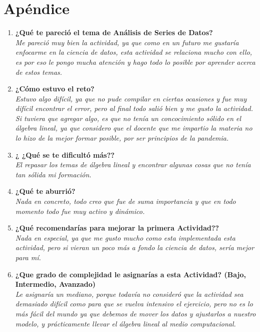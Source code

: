 \documentclass[12pt]{article}
\begin{document}


\section{Apéndice}
\begin{enumerate}
\item \textbf{¿Qué te pareció el tema de Análisis de Series de Datos?}\\
\textit{Me pareció muy bien la actividad, ya que como en un futuro me gustaría enfocarme en la ciencia de datos, esta actividad se relaciona mucho con ello, es por eso le pongo mucha atención y hago todo lo posible por aprender acerca de estos temas.}

\item \textbf{¿Cómo estuvo el reto?}\\
\textit{Estuvo algo difícil, ya que no pude compilar en ciertas ocasiones y fue muy difícil encontrar el error, pero al final todo salió bien y me gusto la actividad. Si tuviera que agregar algo, es que no tenía un concocimiento sólido en el álgebra lineal, ya que considero que el docente que me impartio la materia no lo hizo de la mejor formar posible, por ser principios de la pandemia.}

\item \textbf{¿ ¿Qué se te dificultó más??} \\
\textit{El repasar los temas de álgebra lineal y encontrar algunas cosas que no tenía tan sólida mi formación.}

\item \textbf{¿Qué te aburrió?}\\
\textit{Nada en concreto, todo creo que fue de suma importancia y que en todo momento todo fue muy activo y dinámico.}

\item \textbf{¿Qué recomendarías para mejorar la primera Actividad?? }\\
\textit{Nada en especial, ya que me gusto mucho como esta implementada esta actividad, pero si vieran un poco más a fondo la ciencia de datos, sería mejor para mí.}

\item \textbf{¿Que grado de complejidad le asignarías a esta Actividad? (Bajo, Intermedio, Avanzado)} \\
\textit{Le asignaría un mediano, porque todavía no consideró que la actividad sea demasiado difícil como para que se vuelva intensivo el ejercicio, pero no es lo más fácil del mundo ya que debemos de mover los datos y ajustarlos a nuestro modelo, y prácticamente llevar el álgebra lineal al medio computacional.}


\end{enumerate}
\end{document}
